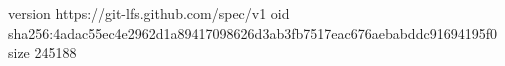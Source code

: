 version https://git-lfs.github.com/spec/v1
oid sha256:4adac55ec4e2962d1a89417098626d3ab3fb7517eac676aebabddc91694195f0
size 245188

